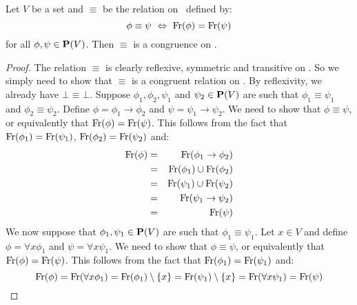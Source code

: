 \begin{prop}\label{logic:prop:congruence:freevar}
Let $V$ be a set and $\equiv$ be the relation on \pv\ defined by:
    \[
    \phi\equiv\psi\ \Leftrightarrow\ \free(\phi)=\free(\psi)
    \]
for all $\phi,\psi\in\mbox{${\bf P}(V)$}$. Then $\equiv$ is a congruence on \pv.
\end{prop}
\begin{proof}
The relation $\equiv$ is clearly reflexive, symmetric and transitive
on \pv. So we simply need to show that $\equiv$ is a congruent
relation on \pv. By reflexivity, we already have $\bot\equiv\bot$.
Suppose $\phi_{1},\phi_{2},\psi_{1}$ and $\psi_{2}\in\mbox{${\bf P}(V)$}$ are such
that $\phi_{1}\equiv\psi_{1}$ and $\phi_{2}\equiv\psi_{2}$. Define
$\phi=\phi_{1}\to\phi_{2}$ and $\psi=\psi_{1}\to\psi_{2}$. We need
to show that $\phi\equiv\psi$, or equivalently that
$\mbox{\rm Fr}(\phi)=\mbox{\rm Fr}(\psi)$. This follows from the fact that
$\mbox{\rm Fr}(\phi_{1})=\mbox{\rm Fr}(\psi_{1})$, $\mbox{\rm Fr}(\phi_{2})=\mbox{\rm Fr}(\psi_{2})$
and:
    \begin{eqnarray*}
    \mbox{\rm Fr}(\phi)&=&\mbox{\rm Fr}(\phi_{1}\to\phi_{2})\\
    &=&\mbox{\rm Fr}(\phi_{1})\cup\mbox{\rm Fr}(\phi_{2})\\
    &=&\mbox{\rm Fr}(\psi_{1})\cup\mbox{\rm Fr}(\psi_{2})\\
    &=&\mbox{\rm Fr}(\psi_{1}\to\psi_{2})\\
    &=&\mbox{\rm Fr}(\psi)
    \end{eqnarray*}
We now suppose that $\phi_{1},\psi_{1}\in\mbox{${\bf P}(V)$}$ are such that
$\phi_{1}\equiv\psi_{1}$. Let $x\in V$ and define $\phi=\forall
x\phi_{1}$ and $\psi=\forall x\psi_{1}$. We need to show that
$\phi\equiv\psi$, or equivalently that $\mbox{\rm Fr}(\phi)=\mbox{\rm Fr}(\psi)$.
This follows from the fact that $\mbox{\rm Fr}(\phi_{1})=\mbox{\rm Fr}(\psi_{1})$
and:
    \[
    \mbox{\rm Fr}(\phi)=\mbox{\rm Fr}(\forall x\phi_{1})
    =\mbox{\rm Fr}(\phi_{1})\setminus\{x\}
    =\mbox{\rm Fr}(\psi_{1})\setminus\{x\}
    =\mbox{\rm Fr}(\forall x\psi_{1})
    =\mbox{\rm Fr}(\psi)
    \]
\end{proof}
